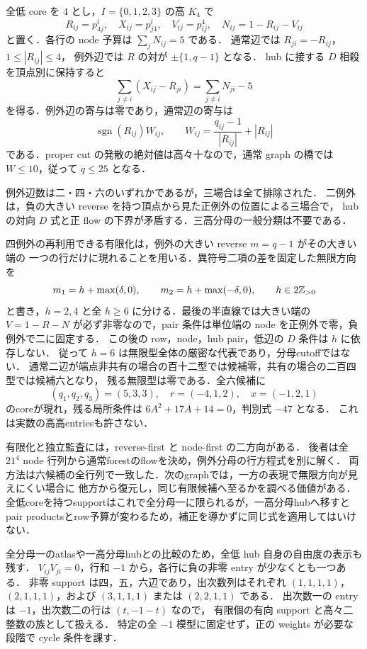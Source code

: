 全低 core を $4$ とし，$I=\{0,1,2,3\}$ の高 $K_4$ で
\[
 R_{ij}=p^i_{4j},\quad X_{ij}=p^i_{j4},\quad V_{ij}=p^4_{ij},
 \quad N_{ij}=1-R_{ij}-V_{ij}
\]
と置く．各行の node 予算は $\sum_jN_{ij}=5$ である．
通常辺では $R_{ji}=-R_{ij}$，$1\le|R_{ij}|\le4$，
例外辺では $R$ の対が $\pm\{1,q-1\}$ となる．
hub に接する $D$ 相殺を頂点別に保持すると
\[
 \sum_{j\ne i}(X_{ij}-R_{ji})
 =\sum_{j\ne i}N_{ji}-5
\]
を得る．例外辺の寄与は零であり，通常辺の寄与は
\[
 \operatorname{sgn}(R_{ij})W_{ij},\qquad
 W_{ij}=\frac{q_{ij}-1}{|R_{ij}|}+|R_{ij}|
\]
である．proper cut の発散の絶対値は高々十なので，通常 graph の橋では
$W\le10$，従って $q\le25$ となる．

例外辺数は二・四・六のいずれかであるが，三場合は全て排除された．
二例外は，負の大きい reverse を持つ頂点から見た正例外の位置による三場合で，
hub の対向 $D$ 式と正 flow の下界が矛盾する．三高分母の一般分類は不要である．

四例外の再利用できる有限化は，例外の大きい reverse $m=q-1$ がその大きい端の
一つの行だけに現れることを用いる．異符号二項の差を固定した無限方向を
\[
 m_1=h+\max(\delta,0),\qquad m_2=h+\max(-\delta,0),\qquad h\in2\mathbb Z_{>0}
\]
と書き，$h=2,4$ と全 $h\ge6$ に分ける．最後の半直線では大きい端の
$V=1-R-N$ が必ず非零なので，pair 条件は単位端の node を正例外で零，負例外で二に固定する．
この後の row，node，hub pair，低辺の $D$ 条件は $h$ に依存しない．
従って $h=6$ は無限型全体の厳密な代表であり，分母cutoffではない．
通常二辺が端点非共有の場合の百十二型では候補零，共有の場合の二百四型では候補六となり，
残る無限型は零である．全六候補に
\[
 (q_1,q_2,q_3)=(5,3,3),\quad r=(-4,1,2),\quad x=(-1,2,1)
\]
のcoreが現れ，残る局所条件は $6A^2+17A+14=0$，判別式 $-47$ となる．
これは実数の高高entriesも許さない．

有限化と独立監査には，reverse-first と node-first の二方向がある．
後者は全 $21^4$ node 行列から通常forestのflowを決め，例外分母の行方程式を別に解く．
両方法は六候補の全行列で一致した．次のgraphでは，一方の表現で無限方向が見えにくい場合に
他方から復元し，同じ有限候補へ至るかを調べる価値がある．
全低coreを持つsupportはこれで全分母一に限られるが，一高分母hubへ移すと
pair productsとrow予算が変わるため，補正を導かずに同じ式を適用してはいけない．

全分母一のatlasや一高分母hubとの比較のため，全低 hub 自身の自由度の表示も残す．
$V_{ij}V_{ji}=0$，行和 $-1$ から，各行に負の非零 entry が少なくとも一つある．
非零 support は四，五，六辺であり，出次数列はそれぞれ
$(1,1,1,1)$，$(2,1,1,1)$，および $(3,1,1,1)$ または $(2,2,1,1)$ である．
出次数一の entry は $-1$，出次数二の行は $(t,-1-t)$ なので，
有限個の有向 support と高々二整数の族として扱える．
特定の全 $-1$ 模型に固定せず，正の weights が必要な段階で cycle 条件を課す．
